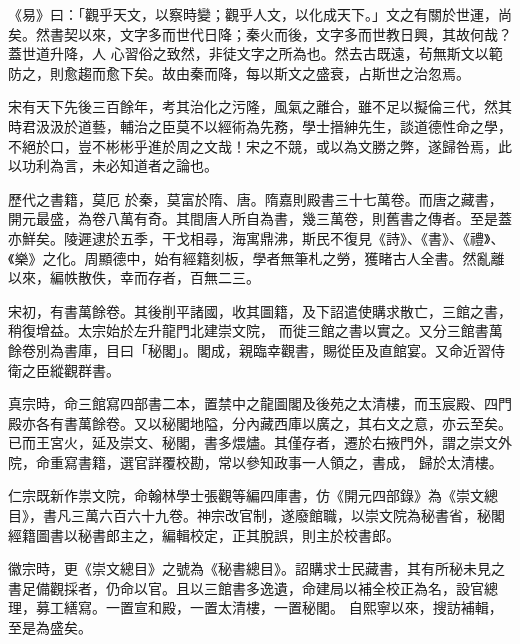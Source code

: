 
\begin{pinyinscope}

 《易》曰：「觀乎天文，以察時變；觀乎人文，以化成天下。」文之有關於世運，尚矣。然書契以來，文字多而世代日降；秦火而後，文字多而世教日興，其故何哉？蓋世道升降，人
 心習俗之致然，非徒文字之所為也。然去古既遠，茍無斯文以範防之，則愈趨而愈下矣。故由秦而降，每以斯文之盛衰，占斯世之治忽焉。



 宋有天下先後三百餘年，考其治化之污隆，風氣之離合，雖不足以擬倫三代，然其時君汲汲於道藝，輔治之臣莫不以經術為先務，學士搢紳先生，談道德性命之學，不絕於口，豈不彬彬乎進於周之文哉！宋之不競，或以為文勝之弊，遂歸咎焉，此以功利為言，未必知道者之論也。



 歷代之書籍，莫厄
 於秦，莫富於隋、唐。隋嘉則殿書三十七萬卷。而唐之藏書，開元最盛，為卷八萬有奇。其間唐人所自為書，幾三萬卷，則舊書之傳者。至是蓋亦鮮矣。陵遲逮於五季，干戈相尋，海寓鼎沸，斯民不復見《詩》、《書》、《禮》、《樂》之化。周顯德中，始有經籍刻板，學者無筆札之勞，獲睹古人全書。然亂離以來，編帙散佚，幸而存者，百無二三。



 宋初，有書萬餘卷。其後削平諸國，收其圖籍，及下詔遣使購求散亡，三館之書，稍復增益。太宗始於左升龍門北建崇文院，
 而徙三館之書以實之。又分三館書萬餘卷別為書庫，目曰「秘閣」。閣成，親臨幸觀書，賜從臣及直館宴。又命近習侍衛之臣縱觀群書。



 真宗時，命三館寫四部書二本，置禁中之龍圖閣及後苑之太清樓，而玉宸殿、四門殿亦各有書萬餘卷。又以秘閣地隘，分內藏西庫以廣之，其右文之意，亦云至矣。已而王宮火，延及崇文、秘閣，書多煨燼。其僅存者，遷於右掖門外，謂之崇文外院，命重寫書籍，選官詳覆校勘，常以參知政事一人領之，書成，
 歸於太清樓。



 仁宗既新作祟文院，命翰林學士張觀等編四庫書，仿《開元四部錄》為《崇文總目》，書凡三萬六百六十九卷。神宗改官制，遂廢館職，以崇文院為秘書省，秘閣經籍圖書以秘書郎主之，編輯校定，正其脫誤，則主於校書郎。



 徽宗時，更《崇文總目》之號為《秘書總目》。詔購求士民藏書，其有所秘未見之書足備觀採者，仍命以官。且以三館書多逸遺，命建局以補全校正為名，設官總理，募工繕寫。一置宣和殿，一置太清樓，一置秘閣。
 自熙寧以來，搜訪補輯，至是為盛矣。




\end{pinyinscope}
